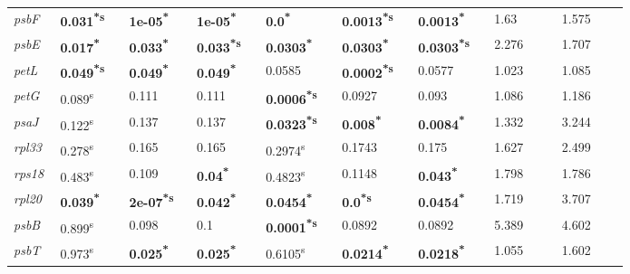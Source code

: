 \documentclass[a4paper]{article}
\begin{document}
\begin{tabular}{p{0.03\linewidth}|p{0.095\linewidth}p{0.095\linewidth}p{0.095\linewidth}|p{0.095\linewidth}p{0.095\linewidth}p{0.095\linewidth}|p{0.095\linewidth}p{0.095\linewidth}}
 \rowcolor{black!20} \textit{psbF} & \textbf{0.031\textsuperscript{*}\textsuperscript{s}} & \textbf{1e-05\textsuperscript{*}} & \textbf{1e-05\textsuperscript{*}} & \textbf{0.0\textsuperscript{*}} & \textbf{0.0013\textsuperscript{*}\textsuperscript{s}} & \textbf{0.0013\textsuperscript{*}} & 1.63 & 1.575\\
\textit{psbE} & \textbf{0.017\textsuperscript{*}} & \textbf{0.033\textsuperscript{*}} & \textbf{0.033\textsuperscript{*}\textsuperscript{s}} & \textbf{0.0303\textsuperscript{*}} & \textbf{0.0303\textsuperscript{*}} & \textbf{0.0303\textsuperscript{*}\textsuperscript{s}} & 2.276 & 1.707\\
 \rowcolor{black!20} \textit{petL} & \textbf{0.049\textsuperscript{*}\textsuperscript{s}} & \textbf{0.049\textsuperscript{*}} & \textbf{0.049\textsuperscript{*}} & 0.0585 & \textbf{0.0002\textsuperscript{*}\textsuperscript{s}} & 0.0577 & 1.023 & 1.085\\
\textit{petG} & 0.089\textsuperscript{s} & 0.111 & 0.111 & \textbf{0.0006\textsuperscript{*}\textsuperscript{s}} & 0.0927 & 0.093 & 1.086 & 1.186\\
 \rowcolor{black!20} \textit{psaJ} & 0.122\textsuperscript{s} & 0.137 & 0.137 & \textbf{0.0323\textsuperscript{*}\textsuperscript{s}} & \textbf{0.008\textsuperscript{*}} & \textbf{0.0084\textsuperscript{*}} & 1.332 & 3.244\\
\textit{rpl33} & 0.278\textsuperscript{s} & 0.165 & 0.165 & 0.2974\textsuperscript{s} & 0.1743 & 0.175 & 1.627 & 2.499\\
 \rowcolor{black!20} \textit{rps18} & 0.483\textsuperscript{s} & 0.109 & \textbf{0.04\textsuperscript{*}} & 0.4823\textsuperscript{s} & 0.1148 & \textbf{0.043\textsuperscript{*}} & 1.798 & 1.786\\
\textit{rpl20} & \textbf{0.039\textsuperscript{*}} & \textbf{2e-07\textsuperscript{*}\textsuperscript{s}} & \textbf{0.042\textsuperscript{*}} & \textbf{0.0454\textsuperscript{*}} & \textbf{0.0\textsuperscript{*}\textsuperscript{s}} & \textbf{0.0454\textsuperscript{*}} & 1.719 & 3.707\\
 \rowcolor{black!20} \textit{psbB} & 0.899\textsuperscript{s} & 0.098 & 0.1 & \textbf{0.0001\textsuperscript{*}\textsuperscript{s}} & 0.0892 & 0.0892 & 5.389 & 4.602\\
\textit{psbT} & 0.973\textsuperscript{s} & \textbf{0.025\textsuperscript{*}} & \textbf{0.025\textsuperscript{*}} & 0.6105\textsuperscript{s} & \textbf{0.0214\textsuperscript{*}} & \textbf{0.0218\textsuperscript{*}} & 1.055 & 1.602\\

\end{tabular}
\end{document}
